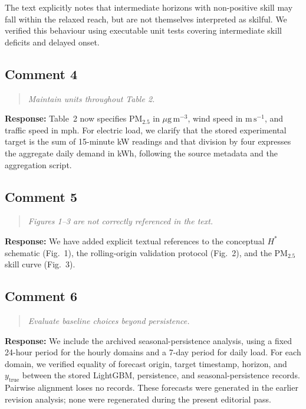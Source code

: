 \documentclass[11pt,a4paper]{article}
\let\originalsubsection\subsection
\renewcommand{\subsection}{\Needspace{9\baselineskip}\originalsubsection}
\newenvironment{reviewcomment}
  {\begin{quote}\itshape}
  {\end{quote}}
\newcommand{\response}{\noindent\textbf{Response:} }
\begin{document}
The text explicitly notes that intermediate horizons with non-positive skill
may fall within the relaxed reach, but are not themselves interpreted as
skilful. We verified this behaviour using executable unit tests covering
intermediate skill deficits and delayed onset.


\subsection*{Comment 4}

\begin{reviewcomment}
Maintain units throughout Table 2.
\end{reviewcomment}

\response
Table~2 now specifies PM$_{2.5}$ in $\mu\mathrm{g\,m^{-3}}$, wind speed in
$\mathrm{m\,s^{-1}}$, and traffic speed in mph. For electric load, we clarify that the
stored experimental target is the sum of 15-minute kW readings and that
division by four expresses the aggregate daily demand in kWh, following the source
metadata and the aggregation script.


\subsection*{Comment 5}

\begin{reviewcomment}
Figures 1--3 are not correctly referenced in the text.
\end{reviewcomment}

\response
We have added explicit textual references to the conceptual $H^*$ schematic
(Fig.~1), the rolling-origin validation protocol (Fig.~2), and the
PM$_{2.5}$ skill curve (Fig.~3).


\subsection*{Comment 6}

\begin{reviewcomment}
Evaluate baseline choices beyond persistence.
\end{reviewcomment}

\response
We include the archived seasonal-persistence analysis, using a fixed
24-hour period for the hourly domains and a 7-day period for daily load.
For each domain, we verified equality of forecast origin, target timestamp,
horizon, and $y_{\mathrm{true}}$ between the stored LightGBM, persistence,
and seasonal-persistence records. Pairwise alignment loses no records.
These forecasts were generated in the earlier revision analysis; none
were regenerated during the present editorial pass.
\end{document}
